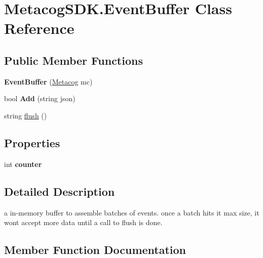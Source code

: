 \hypertarget{classMetacogSDK_1_1EventBuffer}{}\section{Metacog\+S\+D\+K.\+Event\+Buffer Class Reference}
\label{classMetacogSDK_1_1EventBuffer}
\subsection*{Public Member Functions}
\begin{DoxyCompactItemize}
\item 
{\bfseries Event\+Buffer} (\hyperlink{classMetacogSDK_1_1Metacog}{Metacog} mc)\hypertarget{classMetacogSDK_1_1EventBuffer_a26f471aeadaa2c65e72d9d5c5fca85fb}{}\label{classMetacogSDK_1_1EventBuffer_a26f471aeadaa2c65e72d9d5c5fca85fb}

\item 
bool {\bfseries Add} (string json)\hypertarget{classMetacogSDK_1_1EventBuffer_afc7f88e414442994bed411ddd5faaabe}{}\label{classMetacogSDK_1_1EventBuffer_afc7f88e414442994bed411ddd5faaabe}

\item 
string \hyperlink{classMetacogSDK_1_1EventBuffer_a0f949874b91790b01292d2acc2feec84}{flush} ()
\end{DoxyCompactItemize}
\subsection*{Properties}
\begin{DoxyCompactItemize}
\item 
int {\bfseries counter}\hypertarget{classMetacogSDK_1_1EventBuffer_a5e138ae320239d55d901a693146273e9}{}\label{classMetacogSDK_1_1EventBuffer_a5e138ae320239d55d901a693146273e9}

\end{DoxyCompactItemize}


\subsection{Detailed Description}
a in-\/memory buffer to assemble batches of events. once a batch hits it max size, it won\textquotesingle{}t accept more data until a call to flush is done. 

\subsection{Member Function Documentation}

